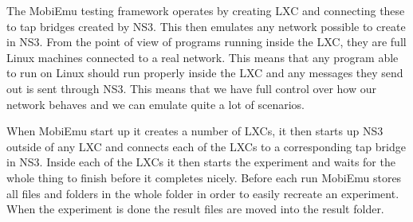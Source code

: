     The MobiEmu testing framework operates by creating LXC and connecting these to tap bridges created by NS3. This then emulates any network possible to create in NS3. From the point of view of programs running inside the LXC, they are full Linux machines connected to a real network. This means that any program able to run on Linux should run properly inside the LXC and any messages they send out is sent through NS3. This means that we have full control over how our network behaves and we can emulate quite a lot of scenarios.
    
    When MobiEmu start up it creates a number of LXCs, it then starts up NS3 outside of any LXC and connects each of the LXCs to a corresponding tap bridge in NS3. Inside each of the LXCs it then starts the experiment and waits for the whole thing to finish before it completes nicely. Before each run MobiEmu stores all files and folders in the whole folder in order to easily recreate an experiment. When the experiment is done the result files are moved into the result folder. 
